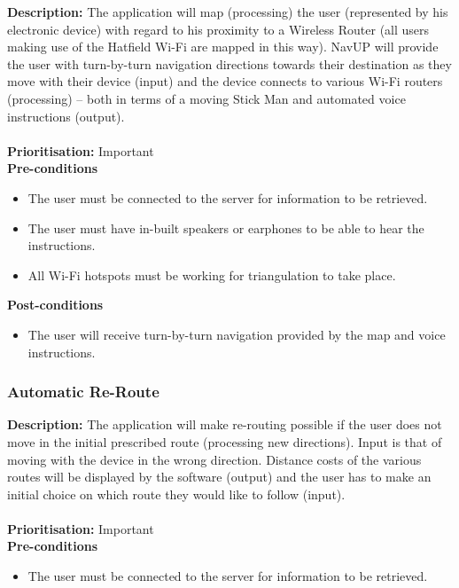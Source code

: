 \documentclass[runningheads,a4paper]{article}
\begin{document}
\textbf{Description:}  The application will map (processing) the user (represented by his electronic device) with regard to his proximity to a Wireless Router (all users making use of the Hatfield Wi-Fi are mapped in this way). NavUP will provide the user with turn-by-turn navigation directions towards their destination as they move with their device (input) and the device connects to various Wi-Fi routers (processing) – both in terms of a moving Stick Man and automated voice instructions (output).\\\\
\noindent
\textbf{Prioritisation:} Important\\
  
  
\textbf{Pre-conditions}
\begin{itemize}
	\item The user must be connected to the server for information to be retrieved.
	\item The user must have in-built speakers or earphones to be able to hear the instructions.
	\item All Wi-Fi hotspots must be working for triangulation to take place.
\end{itemize}
  
\textbf{Post-conditions}
\begin{itemize}
  	\item The user will receive turn-by-turn navigation provided by the map and voice instructions.
\end{itemize}

\subsubsection{Automatic Re-Route}

\textbf{Description:}  The application will make re-routing possible if the user does not move in the initial prescribed route (processing new directions). Input is that of moving with the device in the wrong direction. Distance costs of the various routes will be displayed by the software (output) and the user has to make an initial choice on which route they would like to follow (input).\\\\
\noindent
\textbf{Prioritisation:} Important\\
  
  
\textbf{Pre-conditions}
\begin{itemize}
	\item The user must be connected to the server for information to be retrieved.
\end{itemize}
  
\end{document}
